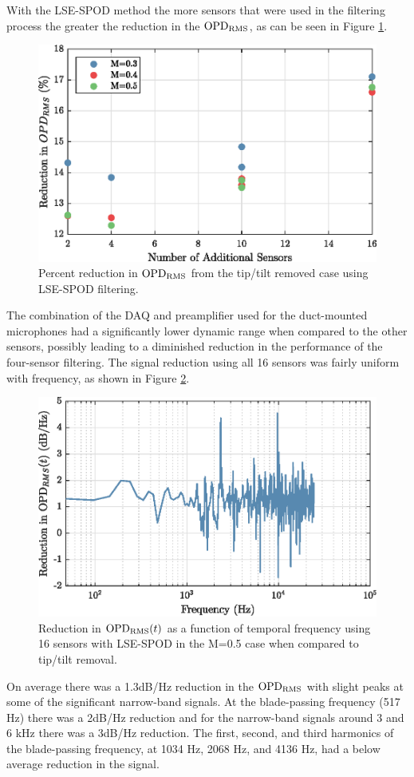 With the LSE-SPOD method the more sensors that were used in the filtering process the greater the reduction in the $\operatorname{OPD_{RMS}}$, as can be seen in Figure \ref{fig:08_lse_summary}.
\begin{figure}
  \centering
  \includegraphics{../matlab/08_conclusion/lse_summary.eps}
  \caption{Percent reduction in $\operatorname{OPD_{RMS}}$ from the tip/tilt removed case using LSE-SPOD filtering.}
  \label{fig:08_lse_summary}
\end{figure}
The combination of the DAQ and preamplifier used for the duct-mounted microphones had a significantly lower dynamic range when compared to the other sensors, possibly leading to a diminished reduction in the performance of the four-sensor filtering.
The signal reduction using all 16 sensors was fairly uniform with frequency, as shown in Figure \ref{fig:08_lse_mspod_freq}.
\begin{figure}
  \centering
  \includegraphics{../matlab/07_multiple_sensor_filtering/lse_mspod_freq.eps}
  \caption{Reduction in $\operatorname{OPD_{RMS}}(t)$ as a function of temporal frequency using 16 sensors with LSE-SPOD in the M=0.5 case when compared to tip/tilt removal.}
  \label{fig:08_lse_mspod_freq}
\end{figure}
On average there was a 1.3dB/Hz reduction in the $\operatorname{OPD_{RMS}}$ with slight peaks at some of the significant narrow-band signals.
At the blade-passing frequency (517 Hz) there was a 2dB/Hz reduction and for the narrow-band signals around 3 and 6 kHz there was a 3dB/Hz reduction.
The first, second, and third harmonics of the blade-passing frequency, at 1034 Hz, 2068 Hz, and 4136 Hz, had a below average reduction in the signal.

